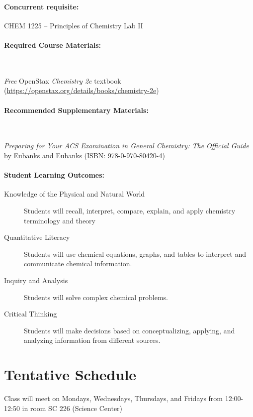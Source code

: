 \documentclass[12pt, letterpaper]{article}
\begin{document}
\paragraph{Concurrent requisite:}
CHEM 1225 -- Principles of Chemistry Lab II

\paragraph{Required Course Materials:} ~

\emph{Free} OpenStax \emph{Chemistry 2e} textbook (\href{https://openstax.org/details/books/chemistry-2e}{https://openstax.org/details/books/chemistry-2e})

\paragraph{Recommended Supplementary Materials:} ~

\emph{Preparing for Your ACS Examination in General Chemistry: The Official Guide} by Eubanks and Eubanks (ISBN: 978-0-970-80420-4)

\paragraph{Student Learning Outcomes:}
\begin{description}
	\item[Knowledge of the Physical and Natural World] Students will recall, interpret, compare, explain, and apply chemistry terminology and theory
	\item[Quantitative Literacy] Students will use chemical equations, graphs, and tables to interpret and communicate chemical information.
	\item[Inquiry and Analysis] Students will solve complex chemical problems.
	\item[Critical Thinking] Students will make decisions based on conceptualizing, applying, and analyzing information from different sources.
\end{description}

\section*{Tentative Schedule}
Class will meet on Mondays, Wednesdays, Thursdays, and Fridays from 12:00-12:50 in room SC 226 (Science Center)
\end{document}
